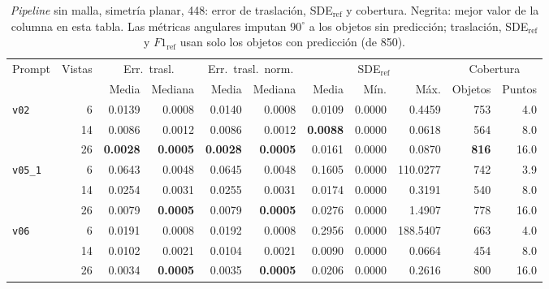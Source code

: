\begin{table}[htbp]
\centering
\caption{\textit{Pipeline} sin malla, simetría planar, 448: error de traslación, SDE$_{\mathrm{ref}}$ y cobertura. Negrita: mejor valor de la columna en esta tabla. Las métricas angulares imputan $90^\circ$ a los objetos sin predicción; traslación, SDE$_{\mathrm{ref}}$ y $F1_{\mathrm{ref}}$ usan solo los objetos con predicción (de 850).}
\label{tab:plane_448_posicion}
\begin{adjustbox}{max width=\textwidth}
\begin{tabular}{lrrrrrrrrrr}
\toprule
\multirow{2}{*}{Prompt} & \multirow{2}{*}{Vistas} & \multicolumn{2}{c}{Err.\ trasl.} & \multicolumn{2}{c}{Err.\ trasl.\ norm.} & \multicolumn{3}{c}{SDE$_{\mathrm{ref}}$} & \multicolumn{2}{c}{Cobertura} \\
\cmidrule(lr){3-4} \cmidrule(lr){5-6} \cmidrule(lr){7-9} \cmidrule(lr){10-11}
 &  & Media & Mediana & Media & Mediana & Media & Mín. & Máx. & Objetos & Puntos \\
\midrule
\multirow{3}{*}{\texttt{v02}} & 6 & 0.0139 & 0.0008 & 0.0140 & 0.0008 & 0.0109 & 0.0000 & 0.4459 & 753 & 4.0 \\
 & 14 & 0.0086 & 0.0012 & 0.0086 & 0.0012 & \textbf{0.0088} & 0.0000 & 0.0618 & 564 & 8.0 \\
 & 26 & \textbf{0.0028} & \textbf{0.0005} & \textbf{0.0028} & \textbf{0.0005} & 0.0161 & 0.0000 & 0.0870 & \textbf{816} & 16.0 \\
\midrule
\multirow{3}{*}{\texttt{v05\_1}} & 6 & 0.0643 & 0.0048 & 0.0645 & 0.0048 & 0.1605 & 0.0000 & 110.0277 & 742 & 3.9 \\
 & 14 & 0.0254 & 0.0031 & 0.0255 & 0.0031 & 0.0174 & 0.0000 & 0.3191 & 540 & 8.0 \\
 & 26 & 0.0079 & \textbf{0.0005} & 0.0079 & \textbf{0.0005} & 0.0276 & 0.0000 & 1.4907 & 778 & 16.0 \\
\midrule
\multirow{3}{*}{\texttt{v06}} & 6 & 0.0191 & 0.0008 & 0.0192 & 0.0008 & 0.2956 & 0.0000 & 188.5407 & 663 & 4.0 \\
 & 14 & 0.0102 & 0.0021 & 0.0104 & 0.0021 & 0.0090 & 0.0000 & 0.0664 & 454 & 8.0 \\
 & 26 & 0.0034 & \textbf{0.0005} & 0.0035 & \textbf{0.0005} & 0.0206 & 0.0000 & 0.2616 & 800 & 16.0 \\
\bottomrule
\end{tabular}
\end{adjustbox}
\end{table}

